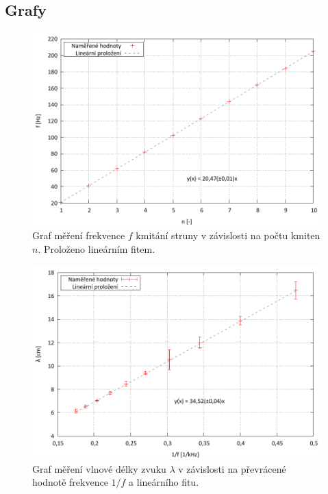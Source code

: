 \documentclass[english]{article}
\begin{document}
\subsection{Grafy}
	
	\begin{figure}[h]
	\begin{center}
		\includegraphics[width=\linewidth]{../gnuplot/9_aku_struna_out.pdf}
		\caption{Graf měření frekvence $f$ kmitání struny v závislosti na počtu kmiten $n$. Proloženo lineárním fitem.}
		\label{fig:g_struna}
	\end{center}
	\end{figure}
	
	\begin{figure}[p]
	\begin{center}
		\vspace*{-1cm}
		\includegraphics[width=\linewidth]{../gnuplot/9_aku_quinck_out.pdf}
		\vspace*{-1cm}    
		\caption{Graf měření vlnové délky zvuku $\lambda$ v závislosti na převrácené hodnotě frekvence $1/f$ a lineárního fitu.}
		\label{fig:g_quinck}
	\end{center}
	\end{figure}
	
\end{document}
